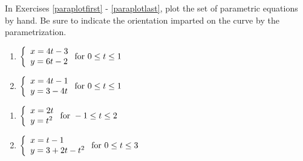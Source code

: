 In Exercises \ref{paraplotfirst} - \ref{paraplotlast}, plot the set of parametric equations by hand. Be sure to indicate the orientation imparted on the curve by the parametrization.  

\begin{multicols}{2} \raggedcolumns 

\begin{enumerate}

\item ${\displaystyle \left\{ \begin{array}{l} x = 4t-3 \\ y = 6t-2 \end{array} \right. \vspace{.25in} \mbox{for } 0 \leq t \leq 1}$ \label{paraplotfirst}
\item ${\displaystyle \left\{ \begin{array}{l} x = 4t-1 \\ y = 3-4t \end{array} \right. \vspace{.25in} \mbox{for } 0 \leq t \leq 1}$

\setcounter{HW}{\value{enumi}}
\end{enumerate}
\end{multicols}

\begin{multicols}{2} \raggedcolumns 
\begin{enumerate}
\setcounter{enumi}{\value{HW}}
\item ${\displaystyle \left\{ \begin{array}{l} x = 2t \\ y = t^2 \end{array} \right. \vspace{.25in} \mbox{for } -1 \leq t \leq 2}$
\item ${\displaystyle \left\{ \begin{array}{l} x = t-1 \\ y = 3+2t-t^2 \end{array} \right. \vspace{.25in} \mbox{for } 0 \leq t \leq 3}$

\setcounter{HW}{\value{enumi}}
\end{enumerate}
\end{multicols}



